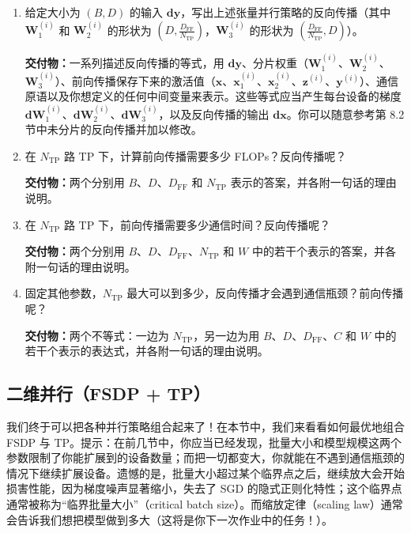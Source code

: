 \begin{enumerate}[label=(\alph*)]
  \item 给定大小为 $(B,D)$ 的输入 $\boldsymbol{dy}$，写出上述张量并行策略的反向传播（其中 $\boldsymbol{W}_1^{(i)}$ 和 $\boldsymbol{W}_2^{(i)}$ 的形状为 $\left(D,\frac{D_{\mathrm{FF}}}{N_{\mathrm{TP}}}\right)$，$\boldsymbol{W}_3^{(i)}$ 的形状为 $\left(\frac{D_{\mathrm{FF}}}{N_{\mathrm{TP}}},D\right)$）。

  \textbf{交付物：}一系列描述反向传播的等式，用 $\boldsymbol{dy}$、分片权重（$\boldsymbol{W}_1^{(i)}$、$\boldsymbol{W}_2^{(i)}$、$\boldsymbol{W}_3^{(i)}$）、前向传播保存下来的激活值（$\boldsymbol{x}$、$\boldsymbol{x}_1^{(i)}$、$\boldsymbol{x}_2^{(i)}$、$\boldsymbol{z}^{(i)}$、$\boldsymbol{y}^{(i)}$）、通信原语以及你想定义的任何中间变量来表示。这些等式应当产生每台设备的梯度 $\boldsymbol{dW}_1^{(i)}$、$\boldsymbol{dW}_2^{(i)}$、$\boldsymbol{dW}_3^{(i)}$，以及反向传播的输出 $\boldsymbol{dx}$。你可以随意参考第 8.2 节中未分片的反向传播并加以修改。

  \item 在 $N_{\mathrm{TP}}$ 路 TP 下，计算前向传播需要多少 FLOPs？反向传播呢？

  \textbf{交付物：}两个分别用 $B$、$D$、$D_{\mathrm{FF}}$ 和 $N_{\mathrm{TP}}$ 表示的答案，并各附一句话的理由说明。

  \item 在 $N_{\mathrm{TP}}$ 路 TP 下，前向传播需要多少通信时间？反向传播呢？

  \textbf{交付物：}两个分别用 $B$、$D$、$D_{\mathrm{FF}}$、$N_{\mathrm{TP}}$ 和 $W$ 中的若干个表示的答案，并各附一句话的理由说明。

  \item 固定其他参数，$N_{\mathrm{TP}}$ 最大可以到多少，反向传播才会遇到通信瓶颈？前向传播呢？

  \textbf{交付物：}两个不等式：一边为 $N_{\mathrm{TP}}$，另一边为用 $B$、$D$、$D_{\mathrm{FF}}$、$C$ 和 $W$ 中的若干个表示的表达式，并各附一句话的理由说明。
\end{enumerate}

\subsection{二维并行（FSDP + TP）}

我们终于可以把各种并行策略组合起来了！在本节中，我们来看看如何最优地组合 FSDP 与 TP。提示：在前几节中，你应当已经发现，批量大小和模型规模这两个参数限制了你能扩展到的设备数量；而把一切都变大，你就能在不遇到通信瓶颈的情况下继续扩展设备。遗憾的是，批量大小超过某个临界点之后，继续放大会开始损害性能，因为梯度噪声显著缩小，失去了 SGD 的隐式正则化特性；这个临界点通常被称为“临界批量大小”（critical batch size）。而缩放定律（scaling law）通常会告诉我们想把模型做到多大（这将是你下一次作业中的任务！）。

